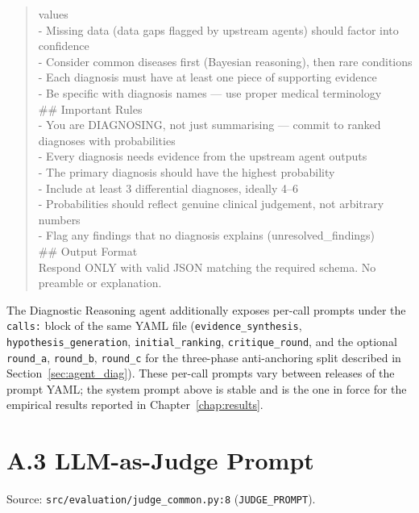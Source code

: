 \begin{quote}
  values\\
- Missing data (data gaps flagged by upstream agents) should factor
  into confidence\\
- Consider common diseases first (Bayesian reasoning), then rare
  conditions\\
- Each diagnosis must have at least one piece of supporting evidence\\
- Be specific with diagnosis names --- use proper medical terminology\\[0.3em]
\#\# Important Rules\\
- You are DIAGNOSING, not just summarising --- commit to ranked
  diagnoses with probabilities\\
- Every diagnosis needs evidence from the upstream agent outputs\\
- The primary diagnosis should have the highest probability\\
- Include at least 3 differential diagnoses, ideally 4--6\\
- Probabilities should reflect genuine clinical judgement, not
  arbitrary numbers\\
- Flag any findings that no diagnosis explains (unresolved\_findings)\\[0.3em]
\#\# Output Format\\
Respond ONLY with valid JSON matching the required schema. No
preamble or explanation.
\end{quote}

The Diagnostic Reasoning agent additionally exposes per-call prompts
under the \texttt{calls:} block of the same YAML file
(\texttt{evidence\_synthesis}, \texttt{hypothesis\_generation},
\texttt{initial\_ranking}, \texttt{critique\_round}, and the
optional \texttt{round\_a}, \texttt{round\_b}, \texttt{round\_c} for
the three-phase anti-anchoring split described in
Section~\ref{sec:agent_diag}). These per-call prompts vary
between releases of the prompt YAML; the system prompt above is
stable and is the one in force for the empirical results reported in
Chapter~\ref{chap:results}.

\section*{A.3 LLM-as-Judge Prompt}
\label{app:judge_prompt}

Source: \texttt{src/evaluation/judge\_common.py:8} (\texttt{JUDGE\_PROMPT}).

